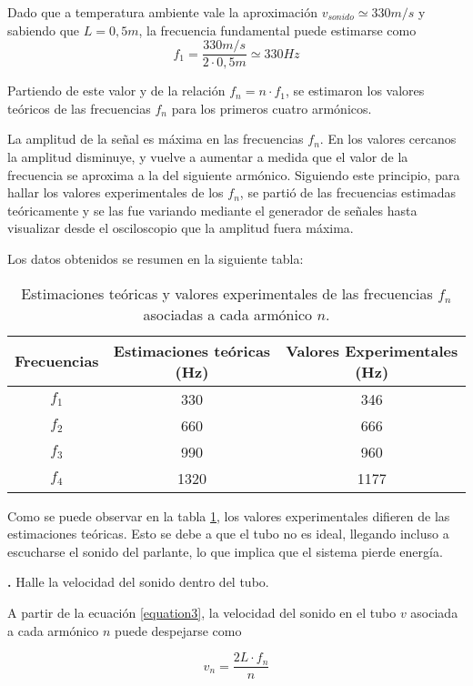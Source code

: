 \documentclass[12pt, a4paper]{article}
\newcounter{step}
\newcommand{\step}[1]
{
  \par\vspace{2ex}
  \stepcounter{step}
  \noindent\textbf{\arabic{step}.} #1\par\vspace{1ex}
}
\begin{document}
Dado que a temperatura ambiente vale la aproximación $v_{sonido}\simeq 330 m/s$ y sabiendo que $L=0,5 m$, la frecuencia fundamental puede estimarse como 
$$f_{1} = \frac{330 m/s}{2 \cdot 0,5m} \simeq 330 Hz$$

Partiendo de este valor y de la relación $f_{n}=n\cdot f_{1}$, se estimaron los valores teóricos de las frecuencias $f_{n}$ para los primeros cuatro armónicos.

La amplitud de la señal es máxima en las frecuencias $f_{n}$. En los valores cercanos la amplitud disminuye, y vuelve a aumentar a medida que el valor de la frecuencia se aproxima a la del siguiente armónico. Siguiendo este principio, para hallar los valores experimentales de los $f_{n}$, se partió de las frecuencias estimadas teóricamente y se las fue variando mediante el generador de señales hasta visualizar desde el osciloscopio que la amplitud fuera máxima.

Los datos obtenidos se resumen en la siguiente tabla:

\begin{table}[H]
  \centering
  \begin{tabular}{|c|c|c|}
  \hline
  Frecuencias & Estimaciones teóricas (Hz) & Valores Experimentales (Hz)\\
  \hline
  $f_1$  & 330  & 346 \\ \hline
  $f_2$  & 660 & 666 \\ \hline
  $f_3$  & 990 & 960 \\ \hline
  $f_4$  & 1320  & 1177 \\ \hline
  \end{tabular}
  \caption{\centering Estimaciones teóricas y valores experimentales de las frecuencias $f_{n}$ asociadas a cada armónico $n$.}
  \label{tabla1}
\end{table}

Como se puede observar en la tabla \ref{tabla1}, los valores experimentales difieren de las estimaciones teóricas. Esto se debe a que el tubo no es ideal, llegando incluso a escucharse el sonido del parlante, lo que implica que el sistema pierde energía.


\step{Halle la velocidad del sonido dentro del tubo.}

A partir de la ecuación \ref{equation3}, la velocidad del sonido en el tubo $v$ asociada a cada armónico $n$ puede despejarse como

\begin{equation}
  v_{n} = \frac{2L \cdot f_{n}}{n}
  \label{equation4}
\end{equation}
\end{document}

